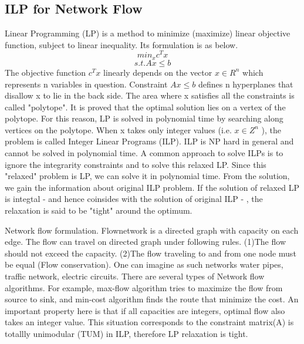 \documentclass[10pt,twocolumn,letterpaper]{article}
\begin{document}
\subsection{ILP for Network Flow}
\label{ILP formulation}
Linear Programming (LP) is a method to minimize (maximize) linear objective function, subject to linear inequality. Its formulation is as below.
\[
min_{x} 　c^{T}x
\]
\[
s.t. Ax \leq b
\]
The objective function \(c^{T}x\) linearly depends on the vector \(x \in R^{n}\) which represents n variables in question. Constraint \(Ax \leq b\) defines n hyperplanes that disallow x to lie in the back side. The area where x satisfies all the constraints is called "polytope". It is proved that the optimal solution lies on a vertex of the polytope. For this reason, LP is solved in polynomial time by searching along vertices on the polytope.
When x takes only integer values (i.e. \(x \in Z^{n}\) ), the problem is called Integer Linear Programs (ILP). ILP is NP hard in general and cannot be solved in polynomial time. 
A common approach to solve ILPs is to ignore the integrarity constraints and to solve this relaxed LP. Since this "relaxed" problem is LP, we can solve it in polynomial time. From the solution, we gain the information about original ILP problem.
If the solution of relaxed LP is integtal - and hence coinsides with the solution of original ILP - , the relaxation is said to be "tight" around the optimum.

Network flow formulation.
Flownetwork is a directed graph with capacity on each edge. The flow can travel on directed graph under following rules. (1)The flow should not exceed the capacity. (2)The flow traveling to and from one node must be equal (Flow conservation). One can imagine as such networks water pipes, traffic network, electric circuits. There are several types of Network flow algorithms. For example, max-flow algorithm tries to maximize the flow from source to sink, and min-cost algorithm finds the route that minimize the cost. An important property here is that if all capacities are integers, optimal flow also takes an integer value. This situation corresponds to the constraint matrix(A) is totallly unimodular (TUM) in ILP, therefore LP relaxation is tight.
\end{document}
